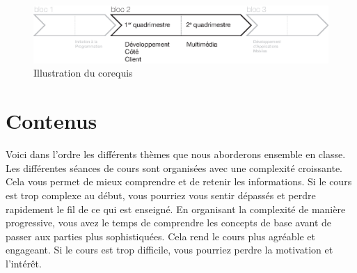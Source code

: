 \begin{figure}[H]
    \begin{center}
        \includegraphics[width=\textwidth]{figures/corequis.eps}
        \caption{Illustration du corequis}
        \label{Fig:GQM}
    \end{center}
\end{figure}
\clearpage

\section{Contenus}

Voici dans l'ordre les différents thèmes que nous aborderons ensemble en classe. Les différentes séances de cours sont organisées avec une complexité croissante. Cela vous permet de mieux comprendre et de retenir les informations. Si le cours est trop complexe au début, vous pourriez vous sentir dépassés et perdre rapidement le fil de ce qui est enseigné. En organisant la complexité de manière progressive, vous avez le temps de comprendre les concepts de base avant de passer aux parties plus sophistiquées. Cela rend le cours plus agréable et engageant. Si le cours est trop difficile, vous pourriez perdre la motivation et l'intérêt.


